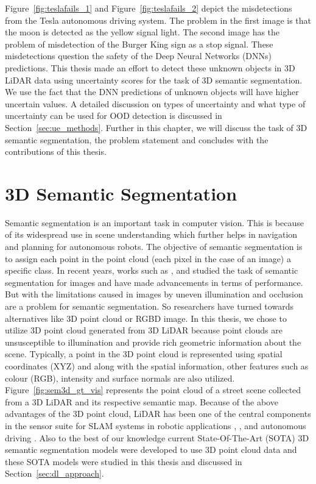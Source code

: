 Figure~\ref{fig:teslafails_1} and Figure~\ref{fig:teslafails_2} depict the misdetections from the Tesla autonomous driving system.
The problem in the first image is that the moon is detected as the yellow signal light.
The second image has the problem of misdetection of the Burger King sign as a stop signal. 
These misdetections question the safety of the Deep Neural Networks (DNNs) predictions.
This thesis made an effort to detect these unknown objects in 3D LiDAR data using uncertainty scores for the task of 3D semantic segmentation.
We use the fact that the DNN predictions of unknown objects will have higher uncertain values.
A detailed discussion on types of uncertainty and what type of uncertainty can be used for OOD detection is discussed in Section~\ref{sec:ue_methods}.
Further in this chapter, we will discuss the task of 3D semantic segmentation, the problem statement and concludes with the contributions of this thesis.

\section{3D Semantic Segmentation}
Semantic segmentation is an important task in computer vision.
This is because of its widespread use in scene understanding which further helps in navigation and planning for autonomous robots.
The objective of semantic segmentation is to assign each point in the point cloud (each pixel in the case of an image) a specific class.
In recent years, works such as \cite{spatialpyramidpool}, \cite{deeplabv3} and \cite{fcn} studied the task of semantic segmentation for images and have made advancements in terms of performance.
But with the limitations caused in images by uneven illumination and occlusion are a problem for semantic segmentation.
So researchers have turned towards alternatives like 3D point cloud or RGBD image.
In this thesis, we chose to utilize 3D point cloud generated from 3D LiDAR because point clouds are unsusceptible to illumination and provide rich geometric information about the scene.
Typically, a point in the 3D point cloud is represented using spatial coordinates (XYZ) and along with the spatial information, other features such as colour (RGB), intensity and surface normals are also utilized.
Figure~\ref{fig:sem3d_gt_vis} represents the point cloud of a street scene collected from a 3D LiDAR and its respective semantic map.
Because of the above advantages of the 3D point cloud, LiDAR has been one of the central components in the sensor suite for SLAM systems in robotic applications \cite{thrun2006stanley}, \cite{patz2008practical}, \cite{hess20162dSLAM} and autonomous driving \cite{li2016vehicle}.
Also to the best of our knowledge current State-Of-The-Art (SOTA) 3D semantic segmentation models were developed to use 3D point cloud data and these SOTA models were studied in this thesis and discussed in Section~\ref{sec:dl_approach}.

